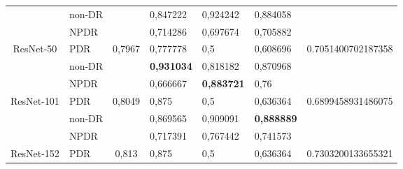 \begin{table}[hbtp]
\begin{center}
\begin{tabular}{|c|l|c|l|l|l|c|}
			& non-DR                                             &                          & 0,847222                                          & 0,924242                                         & 0,884058                                        &                                      \\ \cline{2-2} \cline{4-6}
			& NPDR                                               &                          & 0,714286                                          & 0,697674                                         & 0,705882                                        &                                      \\ \cline{2-2} \cline{4-6}
			\multirow{-3}{*}{ResNet-50}  & PDR                                                & \multirow{-3}{*}{0,7967} & 0,777778                                          & 0,5                                              & 0,608696                                        & \multirow{-3}{*}{0.7051400702187358} \\ \hline
			& non-DR                                             &                          & \textbf{0,931034}                                 & 0,818182                                         & 0,870968                                        &                                      \\ \cline{2-2} \cline{4-6}
			& NPDR                                               &                          & 0,666667                                          & \textbf{0,883721}                                & 0,76                                            &                                      \\ \cline{2-2} \cline{4-6}
			\multirow{-3}{*}{ResNet-101} & PDR                                                & \multirow{-3}{*}{0,8049} & 0,875                                             & 0,5                                              & 0,636364                                        & \multirow{-3}{*}{0.6899458931486075} \\ \hline
			& non-DR                                             &                          & 0,869565                                          & 0,909091                                         & \textbf{0,888889}                               &                                      \\ \cline{2-2} \cline{4-6}
			& NPDR                                               &                          & 0,717391                                          & 0,767442                                         & 0,741573                                        &                                      \\ \cline{2-2} \cline{4-6}
			\multirow{-3}{*}{ResNet-152} & PDR                                                & \multirow{-3}{*}{0,813}  & 0,875                                             & 0,5                                              & 0,636364                                        & \multirow{-3}{*}{0.7303200133655321} \\ \hline
		\end{tabular}
	\end{center}
\end{table}

